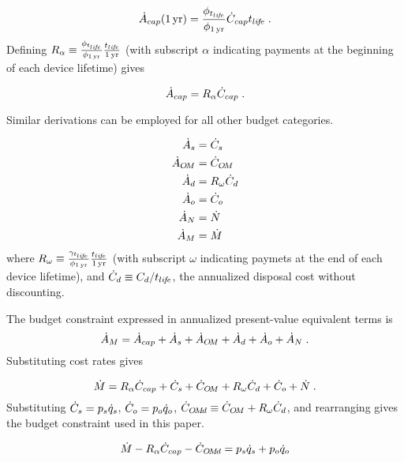 \begin{equation}
  \dot{A}_{cap} (1\,\mathrm{yr}) = \frac{\phi_{t_{li\!f\!e}}}{\phi_{1\,\mathrm{yr}}} \dot{C}_{cap} t_{li\!f\!e} \; .
\end{equation}
%
Defining $R_\alpha \equiv \frac{\phi_{t_{li\!f\!e}}}{\phi_{1\,\mathrm{yr}}} \frac{t_{li\!f\!e}}{1\,\mathrm{yr}}$ 
(with subscript $\alpha$ indicating payments at the beginning of each 
device lifetime) gives

\begin{equation}
  \dot{A}_{cap} = R_\alpha \dot{C}_{cap} \; .
\end{equation}

Similar derivations can be employed for all other budget categories.

\begin{align}
  \dot{A}_s &= \dot{C}_s \\
  \dot{A}_{O\!M} &= \dot{C}_{O\!M} \\
  \dot{A}_d &= R_\omega \dot{C}_d \\
  \dot{A}_o &= \dot{C}_o \\
  \dot{A}_N &= \dot{N} \\
  \dot{A}_M &= \dot{M}
\end{align}
%
where 
$R_\omega \equiv \frac{\gamma_{t_{li\!f\!e}}}{\phi_{1\,\mathrm{yr}}} \frac{t_{li\!f\!e}}{1\,\mathrm{yr}}$
(with subscript $\omega$ indicating paymets 
at the end of each device lifetime), and 
$\dot{C}_d \equiv C_d / t_{li\!f\!e}$, the annualized disposal cost 
without discounting.

The budget constraint expressed in annualized present-value equivalent terms is 
%
\begin{equation}
  \dot{A}_M = \dot{A}_{cap} + 
               \dot{A}_s + 
               \dot{A}_{O\!M} + 
               \dot{A}_d + 
               \dot{A}_o + 
               \dot{A}_N \; .
\end{equation}
%
Substituting cost rates gives

\begin{equation}
  \dot{M} = R_\alpha \dot{C}_{cap} + 
             \dot{C}_s + 
             \dot{C}_{O\!M} + 
             R_\omega \dot{C}_d + 
             \dot{C}_o + 
             \dot{N} \; .
\end{equation}
%
Substituting $\dot{C}_s = p_s \dot{q}_s$,  
$\dot{C}_o = p_o \dot{q}_o$, $\dot{C}_{O\!M\!d} \equiv \dot{C}_{O\!M} + R_\omega \dot{C}_d$, and rearranging gives
the budget constraint used in this paper.

\begin{equation}
  \dot{M} - R_\alpha \dot{C}_{cap} - \dot{C}_{O\!M\!d} = p_s \dot{q}_s + p_o \dot{q}_o
\end{equation}

